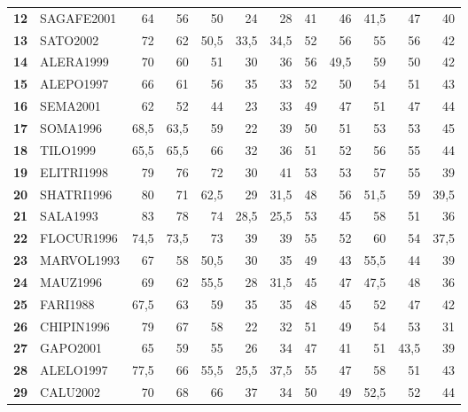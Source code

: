 \begin{landscape}
\begin{table}[p]
\begin{tabular}{>{\bfseries}cl*{10}{D{,}{,}{2.1}}}
12 & SAGAFE2001 & 64 & 56 & 50 & 24 & 28 & 41 & 46 & 41,5 & 47 & 40 \\
13 & SATO2002 & 72 & 62 & 50,5 & 33,5 & 34,5 & 52 & 56 & 55 & 56 & 42 \\
14 & ALERA1999 & 70 & 60 & 51 & 30 & 36 & 56 & 49,5 & 59 & 50 & 42 \\
15 & ALEPO1997 & 66 & 61 & 56 & 35 & 33 & 52 & 50 & 54 & 51 & 43 \\
16 & SEMA2001 & 62 & 52 & 44 & 23 & 33 & 49 & 47 & 51 & 47 & 44 \\
17 & SOMA1996 & 68,5 & 63,5 & 59 & 22 & 39 & 50 & 51 & 53 & 53 & 45 \\
18 & TILO1999 & 65,5 & 65,5 & 66 & 32 & 36 & 51 & 52 & 56 & 55 & 44 \\
19 & ELITRI1998 & 79 & 76 & 72 & 30 & 41 & 53 & 53 & 57 & 55 & 39 \\
20 & SHATRI1996 & 80 & 71 & 62,5 & 29 & 31,5 & 48 & 56 & 51,5 & 59 & 39,5 \\
21 & SALA1993 & 83 & 78 & 74 & 28,5 & 25,5 & 53 & 45 & 58 & 51 & 36 \\
22 & FLOCUR1996 & 74,5 & 73,5 & 73 & 39 & 39 & 55 & 52 & 60 & 54 & 37,5 \\
23 & MARVOL1993 & 67 & 58 & 50,5 & 30 & 35 & 49 & 43 & 55,5 & 44 & 39 \\
24 & MAUZ1996 & 69 & 62 & 55,5 & 28 & 31,5 & 45 & 47 & 47,5 & 48 & 36 \\
25 & FARI1988 & 67,5 & 63 & 59 & 35 & 35 & 48 & 45 & 52 & 47 & 42 \\
26 & CHIPIN1996 & 79 & 67 & 58 & 22 & 32 & 51 & 49 & 54 & 53 & 31 \\
27 & GAPO2001 & 65 & 59 & 55 & 26 & 34 & 47 & 41 & 51 & 43,5 & 39 \\
28 & ALELO1997 & 77,5 & 66 & 55,5 & 25,5 & 37,5 & 55 & 47 & 58 & 51 & 43 \\
29 & CALU2002 & 70 & 68 & 66 & 37 & 34 & 50 & 49 & 52,5 & 52 & 44 \\
\bottomrule
\end{tabular}
\end{table}


\end{landscape}
